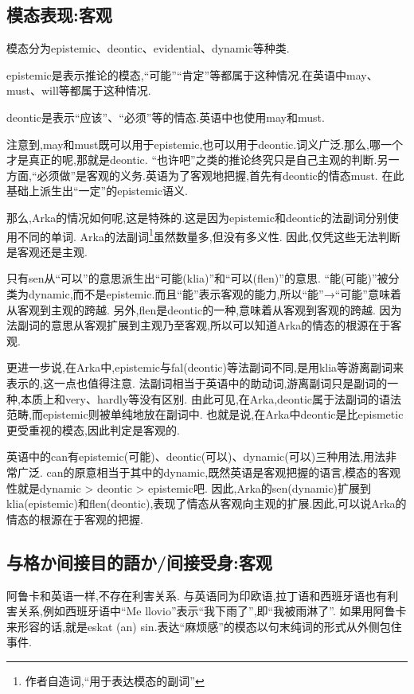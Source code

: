 \subsection{模态表现:客观}

模态分为epistemic、deontic、evidential、dynamic等种类.

epistemic是表示推论的模态,“可能”“肯定”等都属于这种情况.在英语中may、must、will等都属于这种情况.

deontic是表示“应该”、“必须”等的情态.英语中也使用may和must.

注意到,may和must既可以用于epistemic,也可以用于deontic.词义广泛.那么,哪一个才是真正的呢,那就是deontic.
“也许吧”之类的推论终究只是自己主观的判断.另一方面,“必须做”是客观的义务.英语为了客观地把握,首先有deontic的情态must.
在此基础上派生出“一定”的epistemic语义.

那么,Arka的情况如何呢,这是特殊的.这是因为epistemic和deontic的法副词分别使用不同的单词.
Arka的法副词\footnote{作者自造词,``用于表达模态的副词''}虽然数量多,但没有多义性.
因此,仅凭这些无法判断是客观还是主观.


只有sen从“可以”的意思派生出“可能(klia)”和“可以(flen)”的意思.
“能(可能)”被分类为dynamic,而不是epistemic.而且“能”表示客观的能力,所以“能”→“可能”意味着从客观到主观的跨越.
另外,flen是deontic的一种,意味着从客观到客观的跨越.
因为法副词的意思从客观扩展到主观乃至客观,所以可以知道Arka的情态的根源在于客观.

更进一步说,在Arka中,epistemic与fal(deontic)等法副词不同,是用klia等游离副词来表示的,这一点也值得注意.
法副词相当于英语中的助动词,游离副词只是副词的一种,本质上和very、hardly等没有区别.
由此可见,在Arka,deontic属于法副词的语法范畴,而epistemic则被单纯地放在副词中.
也就是说,在Arka中deontic是比epismetic更受重视的模态,因此判定是客观的.

英语中的can有epistemic(可能)、deontic(可以)、dynamic(可以)三种用法,用法非常广泛.
can的原意相当于其中的dynamic,既然英语是客观把握的语言,模态的客观性就是dynamic > deontic > epistemic吧.
因此,Arka的sen(dynamic)扩展到klia(epistemic)和flen(deontic),表现了情态从客观向主观的扩展.因此,可以说Arka的情态的根源在于客观的把握.

\subsection{与格か间接目的語か/间接受身:客观}

阿鲁卡和英语一样,不存在利害关系.
与英语同为印欧语,拉丁语和西班牙语也有利害关系,例如西班牙语中“Me llovio”表示“我下雨了”,即“我被雨淋了”.
如果用阿鲁卡来形容的话,就是eskat (an) sin.表达``麻烦感''的模态以句末纯词的形式从外侧包住事件.

